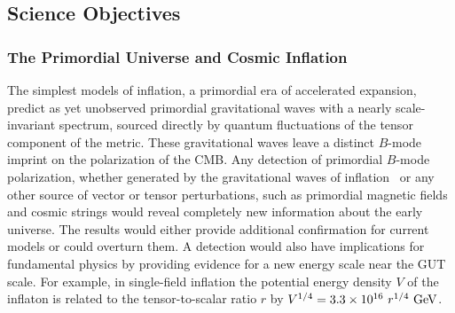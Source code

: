 
\subsection{Science Objectives}
\label{sec:science}

\vspace{-0.05in}
 
\subsubsection{The Primordial Universe and Cosmic Inflation}

\vspace{-0.05in}

The simplest models of inflation, a primordial era of accelerated expansion, predict as yet unobserved primordial gravitational waves with a nearly scale-invariant spectrum, sourced directly by quantum fluctuations of the tensor component of the metric. 
These gravitational waves leave a distinct $B$-mode imprint on the polarization of the \ac{CMB}. Any 
detection of primordial $B$-mode polarization, whether generated by the gravitational waves 
of inflation~\cite{kamionkowski97a,zaldarriaga97} or any other source of vector or tensor perturbations, 
such as primordial magnetic fields \cite{Seshadri:2000ky,Lewis:2004ef,Ade:2015cao,Zucca:2016iur} and 
cosmic strings \cite{Turok:1997gj,Seljak:2006hi,Avgoustidis:2011ax,Moss:2014cra} would reveal completely 
new information about the early universe. The results would either provide additional confirmation for 
current models or could overturn them. A detection would also have implications for fundamental physics 
by providing evidence for a new energy scale near the GUT scale. For example, in single-field inflation 
the potential energy density $V$ of the inflaton is related to the tensor-to-scalar ratio $r$ by 
$V^{1/4} = 3.3 \times 10^{16} \ r^{1/4}\,\, {\rm GeV}$. 

